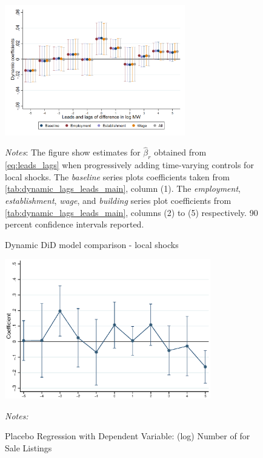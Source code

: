 \begin{figure}[!h]
	\caption{Dynamic DiD model comparison - local shocks}
	\label{fig:}
	\centering
	\includegraphics[width = 0.7\textwidth]{../../analysis/first_differences/output/fd_models_control.png}
	\begin{minipage}{.95\textwidth} \footnotesize
		\vspace{2mm} 
		\textit{Notes}: The figure show estimates for $\hat{\beta}_{r}$ obtained from 
		\autoref{eq:leads_lags} when progressively adding time-varying controls for local shocks. 
		The \textit{baseline} series plots coefficients taken from 
		\autoref{tab:dynamic_lags_leads_main}, column (1). The \textit{employment}, 
		\textit{establishment}, \textit{wage}, and \textit{building} series plot coefficients 
		from \autoref{tab:dynamic_lags_leads_main}, columns (2) to (5) respectively. 90 
		percent confidence intervals reported.  
	\end{minipage}
\end{figure}

\begin{figure}[htb!]\centering
	\caption{Placebo Regression with Dependent Variable: (log) Number of for Sale Listings}
	\label{fig:placebo_nlist}
	\includegraphics[width = 0.8\textwidth]{../../analysis/first_differences_nlist/output/fd_placebo.eps}	
	\begin{minipage}{\textwidth}\footnotesize
		\textit{Notes:}
	\end{minipage}
\end{figure}

